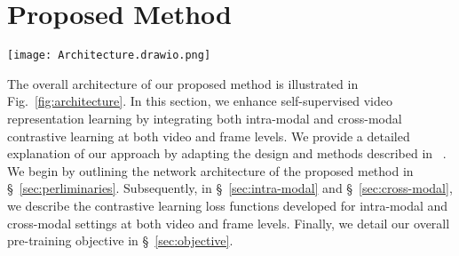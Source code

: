 \section{Proposed Method}
\label{sec:method}

\begin{figure*}[h!]
\vspace{-15pt}
\centering
\texttt{[image: Architecture.drawio.png]}
\vspace{-18pt}
\captionsetup{font=footnotesize}
\caption{ \textbf{A).} The proposed CrossVideoMAE framework comprises two branches: the video branch and the image branch. The video branch employs intra-modal pre-training to ensure that the encoder develops invariance to augmentations within the video domain. The image branch leverages are cross-modal pre-training to distill semantic knowledge from pre-trained MAE~\cite{he2022masked}, transferring insights from sampled frames to corresponding videos. The model is pre-trained jointly across video and image domains using a combination of intra-modal and cross-modal contrastive learning objectives at both the video and frame levels. For downstream tasks, the image branch is discarded, and only the video branch encoder is utilized as the backbone. \textbf{B).} Zoom in version of the feature space. This approach demonstrates the spatiotemporal-spatial alignment of feature embedding correspondence for visible tokens, ensuring invariance at both the video level and frame level, enhancing the representation robustness.}
\label{fig:architecture}
\vspace{-15pt}
\end{figure*}

The overall architecture of our proposed method is illustrated in Fig.~\ref{fig:architecture}. In this section, we enhance self-supervised video representation learning by integrating both intra-modal and cross-modal contrastive learning at both video and frame levels. We provide a detailed explanation of our approach by adapting the design and methods described in ~\cite{liu2024crossvideo}. We begin by outlining the network architecture of the proposed method in \S~\ref{sec:perliminaries}. Subsequently, in \S~\ref{sec:intra-modal} and \S~\ref{sec:cross-modal}, we describe the contrastive learning loss functions developed for intra-modal and cross-modal settings at both video and frame levels. Finally, we detail our overall pre-training objective in \S~\ref{sec:objective}.

